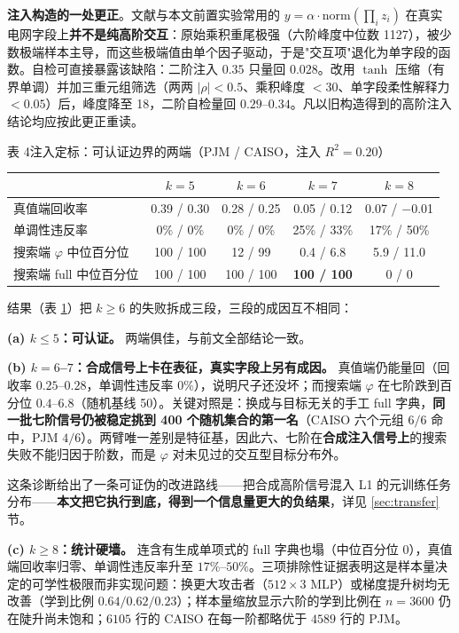 \documentclass[10.5pt,compsoc,UTF8]{CjC}
\theoremstyle{mystyle}
\newcommand{\Rtwo}{R^{2}}
\begin{document}
\textbf{注入构造的一处更正}。文献与本文前置实验常用的 $y=\alpha\cdot\mathrm{norm}(\prod_i z_i)$ 在真实电网字段上\textbf{并不是纯高阶交互}：原始乘积重尾极强（六阶峰度中位数 1127），被少数极端样本主导，而这些极端值由单个因子驱动，于是"交互项"退化为单字段的函数。自检可直接暴露该缺陷：二阶注入 $0.35$ 只量回 $0.028$。改用 $\tanh$ 压缩（有界单调）并加三重元组筛选（两两 $|\rho|<0.5$、乘积峰度 $<30$、单字段柔性解释力 $<0.05$）后，峰度降至 18，二阶自检量回 $0.29$--$0.34$。凡以旧构造得到的高阶注入结论均应按此更正重读。

\begin{table}[htbp]
\centering
{\heiti 表 4\quad 注入定标：可认证边界的两端（PJM / CAISO，注入 $\Rtwo=0.20$）}
\label{tab:ceiling}
\vspace{2mm}
\begin{tabular}{lcccc}
\toprule
 & $k=5$ & $k=6$ & $k=7$ & $k=8$ \\
\midrule
真值端回收率 & 0.39 / 0.30 & 0.28 / 0.25 & 0.05 / 0.12 & 0.07 / $-$0.01 \\
单调性违反率 & 0\% / 0\% & 0\% / 0\% & 25\% / 33\% & 17\% / 50\% \\
搜索端 $\varphi$ 中位百分位 & 100 / 100 & 12 / 99 & 0.4 / 6.8 & 5.9 / 11.0 \\
搜索端 full 中位百分位 & 100 / 100 & 100 / 100 & \textbf{100 / 100} & 0 / 0 \\
\bottomrule
\end{tabular}
\end{table}

结果（表 \ref{tab:ceiling}）把 $k\ge6$ 的失败拆成三段，三段的成因互不相同：

\textbf{(a) $k\le5$：可认证。} 两端俱佳，与前文全部结论一致。

\textbf{(b) $k=6$--$7$：合成信号上卡在表征，真实字段上另有成因。} 真值端仍能量回（回收率 $0.25$--$0.28$，单调性违反率 $0\%$），说明尺子还没坏；而搜索端 $\varphi$ 在七阶跌到百分位 $0.4$--$6.8$（随机基线 50）。关键对照是：换成与目标无关的手工 full 字典，\textbf{同一批七阶信号仍被稳定挑到 400 个随机集合的第一名}（CAISO 六个元组 $6/6$ 命中，PJM $4/6$）。两臂唯一差别是特征基，因此六、七阶在\textbf{合成注入信号上}的搜索失败不能归因于阶数，而是 $\varphi$ 对未见过的交互型目标分布外。

这条诊断给出了一条可证伪的改进路线——把合成高阶信号混入 L1 的元训练任务分布——\textbf{本文把它执行到底，得到一个信息量更大的负结果}，详见 \ref{sec:transfer} 节。

\textbf{(c) $k\ge8$：统计硬墙。} 连含有生成单项式的 full 字典也塌（中位百分位 0），真值端回收率归零、单调性违反率升至 $17\%$--$50\%$。三项排除性证据表明这是样本量决定的可学性极限而非实现问题：换更大攻击者（$512\times3$ MLP）或梯度提升树均无改善（学到比例 $0.64/0.62/0.23$）；样本量缩放显示六阶的学到比例在 $n=3600$ 仍在陡升尚未饱和；$6105$ 行的 CAISO 在每一阶都略优于 $4589$ 行的 PJM。
\end{document}
